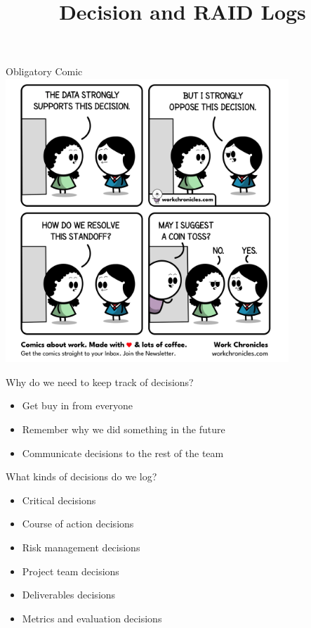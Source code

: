 \documentclass[aspectratio=169]{beamer}
\title{Decision and RAID Logs}
\institute{Engineers for Exploration, UC San Diego}
\begin{document}
\maketitle
\begin{frame}{Obligatory Comic}
    \centering
    \includegraphics[width=0.8\textwidth,height=0.8\textheight,keepaspectratio]{15_decision_comic.png}
\end{frame}
\begin{frame}{Why do we need to keep track of decisions?}
    \begin{itemize}[<+->]
        \item Get buy in from everyone
        \item Remember why we did something in the future
        \item Communicate decisions to the rest of the team
    \end{itemize}
\end{frame}
\begin{frame}{What kinds of decisions do we log?}
    \begin{itemize}[<+->]
        \item Critical decisions
        \item Course of action decisions
        \item Risk management decisions
        \item Project team decisions
        \item Deliverables decisions
        \item Metrics and evaluation decisions
    \end{itemize}
\end{frame}
\end{document}
